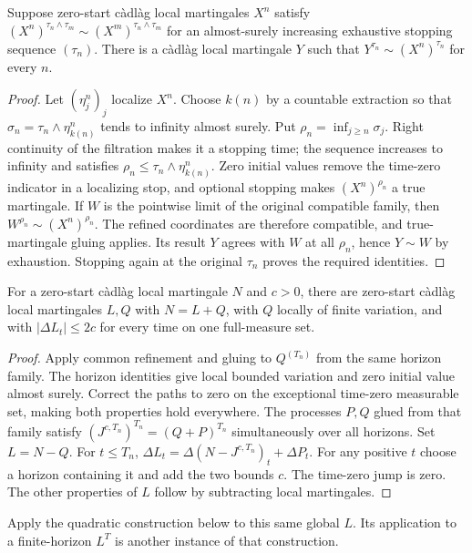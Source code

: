 \begin{lemma}
Suppose zero-start c\`adl\`ag local martingales $X^n$ satisfy
$(X^n)^{\tau_n\wedge\tau_m}\sim(X^m)^{\tau_n\wedge\tau_m}$ for an
almost-surely increasing exhaustive stopping sequence $(\tau_n)$.
There is a c\`adl\`ag local martingale $Y$ such that
$Y^{\tau_n}\sim(X^n)^{\tau_n}$ for every $n$.
\end{lemma}
\begin{proof}
Let $(\eta^n_j)_j$ localize $X^n$. Choose $k(n)$ by a countable extraction
so that $\sigma_n=\tau_n\wedge\eta^n_{k(n)}$ tends to infinity almost surely.
Put $\rho_n=\inf_{j\geq n}\sigma_j$. Right continuity of the filtration
makes it a stopping time; the sequence increases to infinity and satisfies
$\rho_n\leq\tau_n\wedge\eta^n_{k(n)}$.
Zero initial values remove the time-zero indicator in a localizing stop,
and optional stopping makes $(X^n)^{\rho_n}$ a true martingale.
If $W$ is the pointwise limit of the original compatible family, then
$W^{\rho_n}\sim(X^n)^{\rho_n}$. The refined coordinates are therefore
compatible, and true-martingale gluing applies. Its result $Y$ agrees with
$W$ at all $\rho_n$, hence $Y\sim W$ by exhaustion. Stopping again at the
original $\tau_n$ proves the required identities.
\end{proof}

\begin{proposition}
For a zero-start c\`adl\`ag local martingale $N$ and $c>0$, there are
zero-start c\`adl\`ag local martingales $L,Q$ with $N=L+Q$, with $Q$ locally
of finite variation, and with $|\Delta L_t|\leq2c$ for every time on one
full-measure set.
\end{proposition}
\begin{proof}
Apply common refinement and gluing to $Q^{(T_n)}$ from the same horizon
family. The horizon identities give local bounded variation and zero
initial value almost surely. Correct the paths to zero on the exceptional
time-zero measurable set, making both properties hold everywhere.
The processes $P,Q$ glued from that family satisfy
$(J^{c,T_n})^{T_n}=(Q+P)^{T_n}$ simultaneously over all horizons.
Set $L=N-Q$. For $t\leq T_n$,
$\Delta L_t=\Delta(N-J^{c,T_n})_t+\Delta P_t$.
For any positive $t$ choose a horizon containing it and add the two bounds
$c$. The time-zero jump is zero. The other properties of $L$ follow by
subtracting local martingales.
\end{proof}
Apply the quadratic construction below to this same global $L$.
Its application to a finite-horizon $L^T$ is another instance of that construction.

